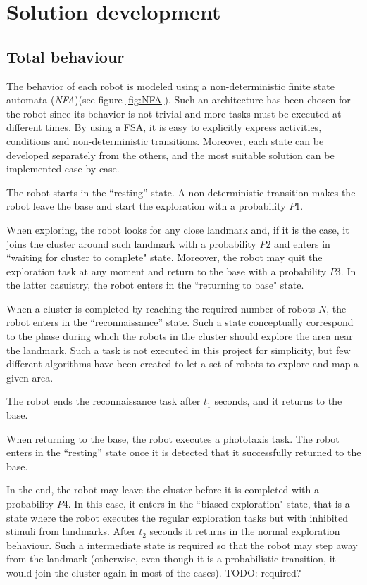\chapter{Solution development}

\section{Total behaviour}

The behavior of each robot is modeled using a non-deterministic finite state automata (\textit{NFA})(see figure \ref{fig:NFA}). Such an architecture has been chosen for the robot since its behavior is not trivial and more tasks must be executed at different times. By using a FSA, it is easy to explicitly express activities, conditions and non-deterministic transitions. Moreover, each state can be developed separately from the others, and the most suitable solution can be implemented case by case.

\noindent
The robot starts in the ``resting'' state. A non-deterministic transition makes the robot leave the base and start the exploration with a probability $P1$. 

\noindent
When exploring, the robot looks for any close landmark and, if it is the case, it joins the cluster around such landmark with a probability $P2$ and enters in ``waiting for cluster to complete" state. Moreover, the robot may quit the exploration task at any moment and return to the base with a probability $P3$. In the latter casuistry, the robot enters in the ``returning to base" state.

\noindent
When a cluster is completed by reaching the required number of robots $N$, the robot enters in the ``reconnaissance'' state. Such a state conceptually correspond to the phase during which the robots in the cluster should explore the area near the landmark. Such a task is not executed in this project for simplicity, but few different algorithms have been created to let a set of robots to explore and map a given area.

\noindent
The robot ends the reconnaissance task after $t_1$ seconds, and it returns to the base.

\noindent
When returning to the base, the robot executes a phototaxis task. The robot enters in the ``resting'' state once it is detected that it successfully returned to the base. 

\noindent
In the end, the robot may leave the cluster before it is completed with a probability $P4$. In this case, it enters in the ``biased exploration" state, that is a state where the robot executes the regular exploration tasks
but with inhibited stimuli from landmarks. After $t_2$ seconds it returns in the normal exploration behaviour. Such a intermediate state is required so that the robot may step away from the landmark (otherwise, even though it is a probabilistic transition, it would join the cluster again in most of the cases). TODO: required?  

